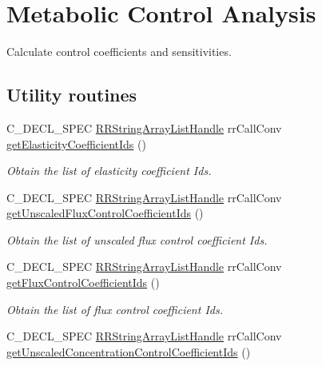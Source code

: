 \hypertarget{group__mca}{
\section{\-Metabolic \-Control \-Analysis}
\label{group__mca}
}


\-Calculate control coefficients and sensitivities.  


\subsection*{\-Utility routines}
\begin{DoxyCompactItemize}
\item 
\-C\-\_\-\-D\-E\-C\-L\-\_\-\-S\-P\-E\-C \*
\hyperlink{rr__c__types_8h_ab1bd3d726b37b2b2be69f0144e5a3e18}{\-R\-R\-String\-Array\-List\-Handle} \*
rr\-Call\-Conv \hyperlink{group__utility_ga05627171cbd6980a53f3eb507092b056}{get\-Elasticity\-Coefficient\-Ids} ()
\begin{DoxyCompactList}\small\item\em \-Obtain the list of elasticity coefficient \-Ids. \end{DoxyCompactList}\item 
\-C\-\_\-\-D\-E\-C\-L\-\_\-\-S\-P\-E\-C \*
\hyperlink{rr__c__types_8h_ab1bd3d726b37b2b2be69f0144e5a3e18}{\-R\-R\-String\-Array\-List\-Handle} \*
rr\-Call\-Conv \hyperlink{group__utility_ga33729a05b78de40fde21f1f4b3ae3a37}{get\-Unscaled\-Flux\-Control\-Coefficient\-Ids} ()
\begin{DoxyCompactList}\small\item\em \-Obtain the list of unscaled flux control coefficient \-Ids. \end{DoxyCompactList}\item 
\-C\-\_\-\-D\-E\-C\-L\-\_\-\-S\-P\-E\-C \*
\hyperlink{rr__c__types_8h_ab1bd3d726b37b2b2be69f0144e5a3e18}{\-R\-R\-String\-Array\-List\-Handle} \*
rr\-Call\-Conv \hyperlink{group__utility_ga3fbcefa95e6e420c8f339e8b1ae1a1f3}{get\-Flux\-Control\-Coefficient\-Ids} ()
\begin{DoxyCompactList}\small\item\em \-Obtain the list of flux control coefficient \-Ids. \end{DoxyCompactList}\item 
\-C\-\_\-\-D\-E\-C\-L\-\_\-\-S\-P\-E\-C \*
\hyperlink{rr__c__types_8h_ab1bd3d726b37b2b2be69f0144e5a3e18}{\-R\-R\-String\-Array\-List\-Handle} \*
rr\-Call\-Conv \hyperlink{group__utility_ga5a6f111ce5754dc0d23d08fc975bcbf9}{get\-Unscaled\-Concentration\-Control\-Coefficient\-Ids} ()

\end{DoxyCompactItemize}
